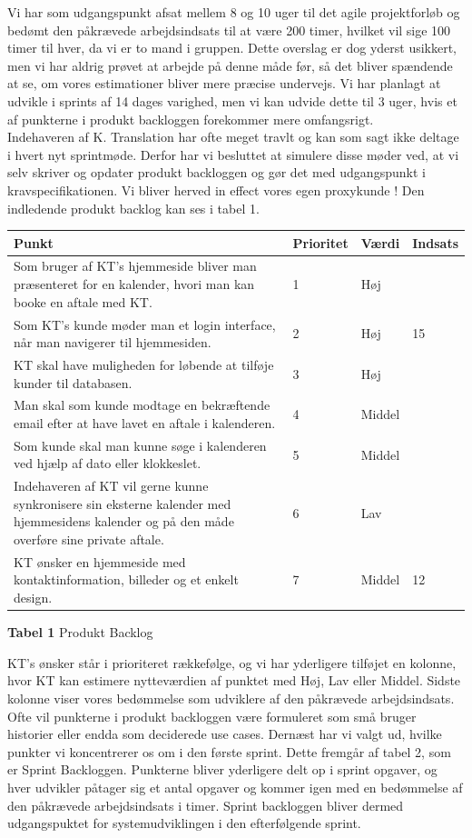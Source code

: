 \documentclass[12pt]{article}   %
\begin{document}
Vi har som udgangspunkt afsat mellem 8 og 10 uger til det agile projektforløb
og bedømt den påkrævede arbejdsindsats til at være 200 timer, hvilket vil sige 100
timer til hver, da vi er to mand i gruppen. Dette overslag er dog yderst
usikkert, men vi har aldrig prøvet at arbejde på denne måde før, så det bliver
spændende at se, om vores estimationer bliver mere præcise undervejs. Vi har
planlagt at udvikle i sprints af 14 dages varighed, men vi kan udvide dette til 3
uger, hvis et af punkterne i produkt backloggen forekommer mere omfangsrigt.\\
Indehaveren af K. Translation har ofte meget travlt og kan som sagt ikke
deltage i hvert nyt sprintmøde. Derfor har vi besluttet at simulere disse
møder ved, at vi selv skriver og opdater produkt backloggen og gør det med
udgangspunkt i kravspecifikationen. Vi bliver herved in effect vores egen 
proxykunde ! Den indledende produkt backlog kan ses i tabel 1.

\begin{center}
	\begin{tabular}{|p{8cm}|l|l|l|}
		\hline
Punkt & Prioritet & Værdi & Indsats \\ \hline
Som bruger af KT's hjemmeside bliver man præsenteret for en kalender, hvori man
kan booke en aftale med KT. & 1 & Høj &     \\ \hline
Som KT's kunde møder man et login interface, når man navigerer til hjemmesiden. & 2 &
Høj & 15  \\ \hline
KT skal have muligheden for løbende at tilføje kunder til databasen. & 3 & Høj
& \\ \hline
Man skal som kunde modtage en bekræftende email efter at have lavet en aftale
i kalenderen. & 4 & Middel &   \\ \hline
Som kunde skal man kunne søge i kalenderen ved hjælp af dato eller klokkeslet.
& 5  & Middel &   \\ \hline
Indehaveren af KT vil gerne kunne synkronisere sin eksterne kalender med
hjemmesidens kalender og på den måde overføre sine private aftale. & 6 & Lav &
\\ \hline
KT ønsker en hjemmeside med kontaktinformation, billeder og et enkelt design.
& 7 & Middel & 12 \\ \hline
\end{tabular}
\caption{\textbf{Tabel 1} Produkt Backlog}
\end{center}
\vspace{0.5cm}

KT's ønsker står i prioriteret rækkefølge, og vi har yderligere tilføjet en
kolonne, hvor KT kan estimere nytteværdien af punktet med Høj, Lav eller
Middel. Sidste kolonne viser vores bedømmelse som udviklere af den påkrævede
arbejdsindsats. Ofte vil punkterne i produkt backloggen være formuleret som
små bruger historier eller endda som deciderede use cases. Dernæst har vi
valgt ud, hvilke punkter vi koncentrerer os om i den første sprint. Dette
fremgår af tabel 2, som er Sprint Backloggen. Punkterne bliver yderligere
delt op i sprint opgaver, og hver udvikler påtager sig et antal opgaver og
kommer igen med en bedømmelse af den påkrævede arbejdsindsats i timer. Sprint
backloggen bliver dermed udgangspuktet for systemudviklingen i den
efterfølgende sprint. 
\end{document}
